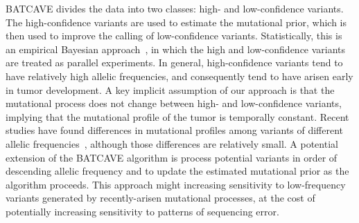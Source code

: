 \documentclass[a4,center,fleqn]{NAR}
\newcommand{\batcave}{BATCAVE\xspace}
\begin{document}
\batcave divides the data into two classes: high- and low-confidence variants.
The high-confidence variants are used to estimate the mutational prior, which is then used to improve the calling of low-confidence variants.
Statistically, this is an empirical Bayesian approach~\citep{Robbins1954}, in which the high and low-confidence variants are treated as parallel experiments\citep{Morris1983,Efron2014}. 
In general, high-confidence variants tend to have relatively high allelic frequencies, and consequently tend to have arisen early in tumor development.
A key implicit assumption of our approach is that the mutational process does not change between high- and low-confidence variants, implying that the mutational profile of the tumor is temporally constant.
Recent studies have found differences in mutational profiles among variants of different allelic frequencies~\citep{Rubanova2018a}, although those differences are relatively small.
A potential extension of the \batcave algorithm is process potential variants in order of descending allelic frequency and to update the estimated mutational prior as the algorithm proceeds.
This approach might increasing sensitivity to low-frequency variants generated by recently-arisen mutational processes, at the cost of potentially increasing sensitivity to patterns of sequencing error.

\end{document}
